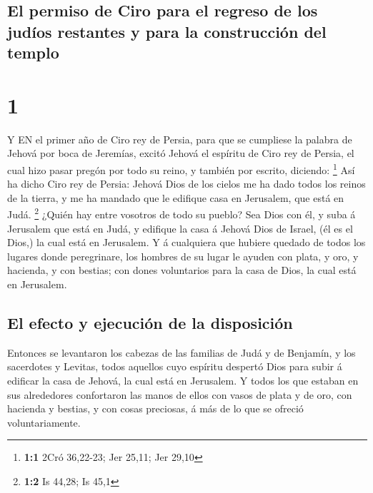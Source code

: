 \hypertarget{el-permiso-de-ciro-para-el-regreso-de-los-juduxedos-restantes-y-para-la-construcciuxf3n-del-templo}{%
\subsection{El permiso de Ciro para el regreso de los judíos restantes y
para la construcción del
templo}\label{el-permiso-de-ciro-para-el-regreso-de-los-juduxedos-restantes-y-para-la-construcciuxf3n-del-templo}}

\hypertarget{section}{%
\section{1}\label{section}}

 Y EN el primer año de Ciro rey de Persia, para que se
cumpliese la palabra de Jehová por boca de Jeremías, excitó Jehová el
espíritu de Ciro rey de Persia, el cual hizo pasar pregón por todo su
reino, y también por escrito, diciendo: \footnote{\textbf{1:1} 2Cró
  36,22-23; Jer 25,11; Jer 29,10}  Así ha dicho Ciro rey de
Persia: Jehová Dios de los cielos me ha dado todos los reinos de la
tierra, y me ha mandado que le edifique casa en Jerusalem, que está en
Judá. \footnote{\textbf{1:2} Is 44,28; Is 45,1}  ¿Quién hay
entre vosotros de todo su pueblo? Sea Dios con él, y suba á Jerusalem
que está en Judá, y edifique la casa á Jehová Dios de Israel, (él es el
Dios,) la cual está en Jerusalem.  Y á cualquiera que
hubiere quedado de todos los lugares donde peregrinare, los hombres de
su lugar le ayuden con plata, y oro, y hacienda, y con bestias; con
dones voluntarios para la casa de Dios, la cual está en Jerusalem.

\hypertarget{el-efecto-y-ejecuciuxf3n-de-la-disposiciuxf3n}{%
\subsection{El efecto y ejecución de la
disposición}\label{el-efecto-y-ejecuciuxf3n-de-la-disposiciuxf3n}}

 Entonces se levantaron los cabezas de las familias de Judá
y de Benjamín, y los sacerdotes y Levitas, todos aquellos cuyo espíritu
despertó Dios para subir á edificar la casa de Jehová, la cual está en
Jerusalem.  Y todos los que estaban en sus alrededores
confortaron las manos de ellos con vasos de plata y de oro, con hacienda
y bestias, y con cosas preciosas, á más de lo que se ofreció
voluntariamente.

